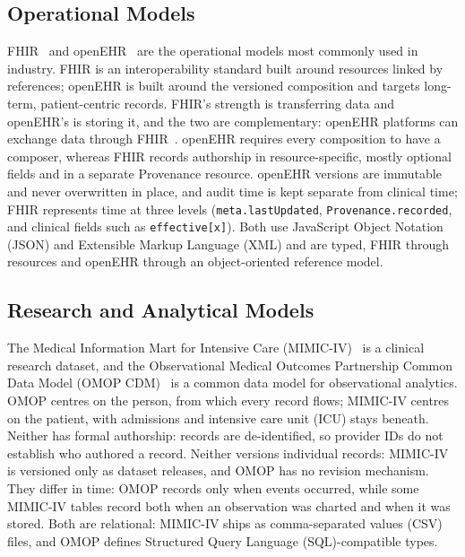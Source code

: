 \documentclass[sigconf]{acmart}
\begin{document}
\subsection{Operational Models}
FHIR~\cite{fhir-r4} and openEHR~\cite{openehr-rm} are the operational models
most commonly used in industry. FHIR is an interoperability standard built
around resources linked by references; openEHR is built around the versioned
composition and targets long-term, patient-centric records. FHIR's strength is
transferring data and openEHR's is storing it, and the two are complementary:
openEHR platforms can exchange data through FHIR~\cite{fhirconnect}. openEHR
requires every composition to have a composer, whereas FHIR records authorship
in resource-specific, mostly optional fields and in a separate Provenance
resource. openEHR versions are immutable and never overwritten in place, and
audit time is kept separate from clinical time; FHIR represents time at three
levels (\texttt{meta.lastUpdated}, \texttt{Provenance.recorded}, and clinical
fields such as \texttt{effective[x]}). Both use JavaScript Object Notation (JSON) and Extensible Markup Language
(XML) and are typed,
FHIR through resources and openEHR through an object-oriented reference model.

\subsection{Research and Analytical Models}
The Medical Information Mart for Intensive Care (MIMIC-IV)~\cite{mimic-iv} is
a clinical research dataset, and the Observational Medical Outcomes Partnership
Common Data Model (OMOP CDM)~\cite{omop-cdm} is a common data model for
observational analytics.
OMOP centres on the person, from which every record flows; MIMIC-IV centres on
the patient, with admissions and intensive care unit (ICU) stays beneath. Neither has formal
authorship: records are de-identified, so provider IDs do not establish who
authored a record. Neither versions individual records: MIMIC-IV is versioned
only as dataset releases, and OMOP has no revision mechanism. They differ in
time: OMOP records only when events occurred, while some MIMIC-IV tables record
both when an observation was charted and when it was stored. Both are
relational: MIMIC-IV ships as comma-separated values (CSV) files, and OMOP defines
Structured Query Language (SQL)-compatible types.
\end{document}
